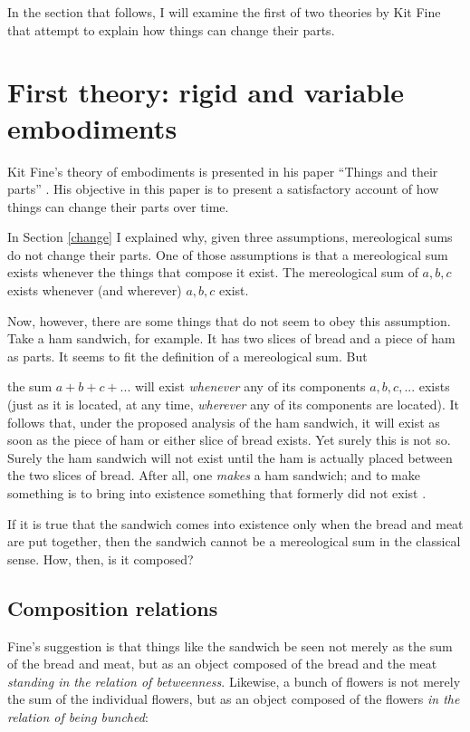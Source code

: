 \documentclass[12pt,twoside]{reedfancy}
\newenvironment{squote}{%
	\begin{spacing}{1}
	\begin{list}{}{%
	\setlength{\labelwidth}{0pt}%
	\rightmargin\leftmargin%
	}
	\item\relax
	}{%
	\end{list}%
	\end{spacing}
	}
\begin{document}
\begin{spacing}{1.25}
In the section that follows, I will examine the first of two theories
by Kit Fine that attempt to explain how things can change their parts.

\section{First theory: rigid and variable embodiments}
\label{fine-h}
Kit Fine's theory of embodiments is presented in his paper ``Things
and their parts'' \citeyearpar{fine1999}.  His objective in this paper
is to present a satisfactory account of how things can change their
parts over time.

In Section \ref{change} I explained why, given three assumptions,
mereological sums do not change their parts.  One of those assumptions
is that a mereological sum exists whenever the things that compose it
exist.  The mereological sum of $a, b, c$ exists whenever (and
wherever) $a, b, c$ exist.

Now, however, there are some things that do not seem to obey this
assumption.  Take a ham sandwich, for example.  It has two slices of
bread and a piece of ham as parts.  It seems to fit the definition of
a mereological sum.  But

\begin{squote}
the sum $a + b + c + ... $ will exist {\em whenever} any of
its components $a, b, c, ... $ exists (just as it is
located, at any time, {\em wherever} any of its components are
located).  It follows that, under the proposed analysis of the ham
sandwich, it will exist as soon as the piece of ham or either slice of
bread exists.  Yet surely this is not so.  Surely the ham sandwich
will not exist until the ham is actually placed between the two slices
of bread.  After all, one {\em makes} a ham sandwich; and to make
something is to bring into existence something that formerly did not
exist \citep[62]{fine1999}.
\end{squote}

If it is true that the sandwich comes into existence only when the
bread and meat are put together, then the sandwich cannot be a
mereological sum in the classical sense.  How, then, is it composed?

\subsection{Composition relations}
\label{rigid}
Fine's suggestion is that things like the sandwich be seen not merely
as the sum of the bread and meat, but as an object composed of the
bread and the meat {\em standing in the relation of betweenness}.
Likewise, a bunch of flowers is not merely the sum of the individual
flowers, but as an object composed of the flowers {\em in the relation
  of being bunched}:


\end{spacing}
\end{document}

